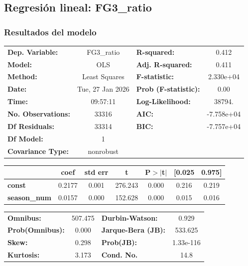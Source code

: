 \subsection{Regresión lineal: FG3_ratio}

\subsubsection{Resultados del modelo}
\begin{center}
\begin{tabular}{lclc}
\toprule
\textbf{Dep. Variable:}    &    FG3\_ratio    & \textbf{  R-squared:         } &     0.412   \\
\textbf{Model:}            &       OLS        & \textbf{  Adj. R-squared:    } &     0.411   \\
\textbf{Method:}           &  Least Squares   & \textbf{  F-statistic:       } & 2.330e+04   \\
\textbf{Date:}             & Tue, 27 Jan 2026 & \textbf{  Prob (F-statistic):} &     0.00    \\
\textbf{Time:}             &     09:57:11     & \textbf{  Log-Likelihood:    } &    38794.   \\
\textbf{No. Observations:} &       33316      & \textbf{  AIC:               } & -7.758e+04  \\
\textbf{Df Residuals:}     &       33314      & \textbf{  BIC:               } & -7.757e+04  \\
\textbf{Df Model:}         &           1      & \textbf{                     } &             \\
\textbf{Covariance Type:}  &    nonrobust     & \textbf{                     } &             \\
\bottomrule
\end{tabular}
\begin{tabular}{lcccccc}
                     & \textbf{coef} & \textbf{std err} & \textbf{t} & \textbf{P$> |$t$|$} & \textbf{[0.025} & \textbf{0.975]}  \\
\midrule
\textbf{const}       &       0.2177  &        0.001     &   276.243  &         0.000        &        0.216    &        0.219     \\
\textbf{season\_num} &       0.0157  &        0.000     &   152.628  &         0.000        &        0.015    &        0.016     \\
\bottomrule
\end{tabular}
\begin{tabular}{lclc}
\textbf{Omnibus:}       & 507.475 & \textbf{  Durbin-Watson:     } &     0.929  \\
\textbf{Prob(Omnibus):} &   0.000 & \textbf{  Jarque-Bera (JB):  } &   533.625  \\
\textbf{Skew:}          &   0.298 & \textbf{  Prob(JB):          } & 1.33e-116  \\
\textbf{Kurtosis:}      &   3.173 & \textbf{  Cond. No.          } &      14.8  \\
\bottomrule
\end{tabular}
\end{center}


